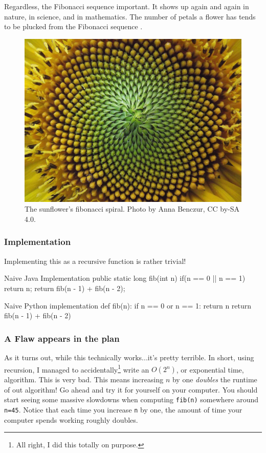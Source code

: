 Regardless, the Fibonacci sequence important.  It shows up again and again in nature, in science, and in mathematics.  The number of petals a flower has tends to be plucked from the Fibonacci sequence \cite{turner2020flowers}.

\begin{figure}
	\centering
	\includegraphics[width=0.7\linewidth]{pics/sunflower}
	\caption{The sunflower's fibonacci spiral. Photo by Anna Benczur, CC by-SA 4.0.}
	\label{fig:sunflower}
\end{figure}




\subsubsection{Implementation}
Implementing this as a recursive function is rather trivial!

\begin{javacode}{Naive Java Implementation}
public static long fib(int n){
	if(n == 0 || n == 1) {
		return n;
	}
	return fib(n - 1) + fib(n - 2);
}
\end{javacode}

\begin{pycode}{Naive Python implementation}
def fib(n):
	if n == 0 or n == 1:
		return n
	return fib(n - 1) + fib(n - 2)
\end{pycode}

\subsubsection{A Flaw appears in the plan}
As it turns out, while this technically works...it's pretty terrible.  In short, using recursion, I managed to accidentally\footnote{All right, I did this totally on purpose.} write an $ O(2^n) $, or exponential time, algorithm. This is very bad.  This means increasing $ n $ by one \emph{doubles} the runtime of out algorithm! Go ahead and try it for yourself on your computer.  You should start seeing some massive slowdowns when computing \texttt{fib(n)} somewhere around \texttt{n=45}.  Notice that each time you increase \texttt{n} by one, the amount of time your computer spends working roughly doubles.

